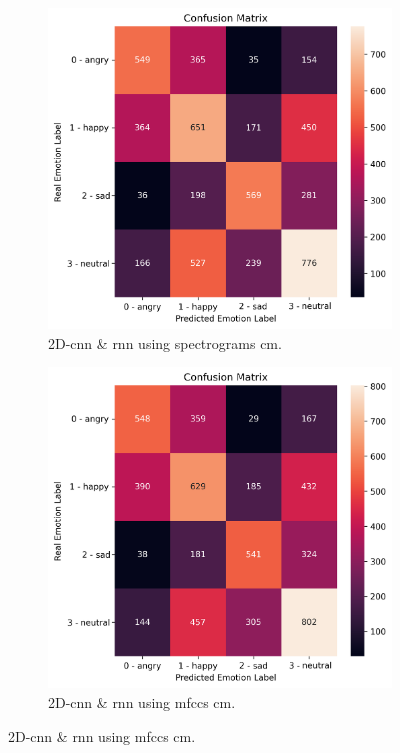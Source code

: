 \begin{figure}[H]
	\begin{subfigure}{.5\textwidth}
		\centering
		\includegraphics[width=.9\linewidth]{figs/appendix/feature_selection/LSTMSpec.png}
		\caption{2D-\ac{cnn} \& \ac{rnn} using spectrograms \ac{cm}.}
	\end{subfigure}%
	\begin{subfigure}{.5\textwidth}
		\centering
		\includegraphics[width=.9\linewidth]{figs/appendix/feature_selection/LSTMMFCC.png}
		\caption{2D-\ac{cnn} \& \ac{rnn} using \ac{mfccs} \ac{cm}.}

\end{subfigure}
\end{figure}
